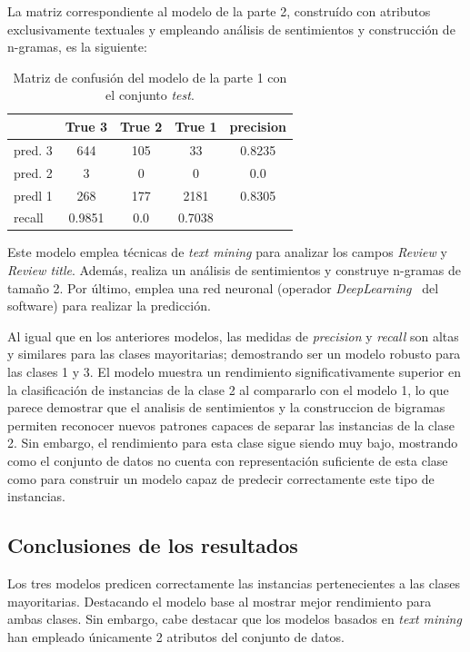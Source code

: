 \documentclass[es]{uc3mreport}
\begin{document}
\begin{report}
La matriz correspondiente al modelo de la parte 2, construído con atributos
exclusivamente textuales y empleando análisis de sentimientos y construcción de
n-gramas, es la siguiente:

\begin{table}[H]
\center
\begin{tabular}{@{}lccc|c@{}}
    \toprule
             & True 3 & True 2 & True 1 & precision\\
    \hline
    pred. 3  & 644 & 105       & 33     & 0.8235   \\
    pred. 2  & 3   & 0         & 0      & 0.0      \\
    predl 1  & 268 & 177       & 2181   & 0.8305   \\
    \hline
    recall   & 0.9851 & 0.0 & 0.7038 &          \\
    \bottomrule
\end{tabular}
\caption{Matriz de confusión del modelo de la parte 1 con el conjunto \textit{test}.}
\end{table}

Este modelo emplea técnicas de \textit{text mining} para analizar los campos
\textit{Review} y \textit{Review title}. Además, realiza un análisis de
sentimientos y construye n-gramas de tamaño 2. Por último, emplea una red neuronal (operador
\textit{DeepLearning}~\cite{deeplearning} del software) para realizar la
predicción.

Al igual que en los anteriores modelos, las medidas de \textit{precision} y
\textit{recall} son altas y similares para las clases mayoritarias; demostrando
ser un modelo robusto para las clases 1 y 3. El modelo muestra un
rendimiento significativamente superior en la clasificación de instancias de la clase
2 al compararlo con el modelo 1, lo que parece demostrar que el analisis de
sentimientos y la construccion de bigramas permiten reconocer nuevos patrones
capaces de separar las instancias de la clase 2. Sin embargo, el rendimiento
para esta clase sigue siendo muy bajo, mostrando como el conjunto de datos no
cuenta con representación suficiente de esta clase como para construir un modelo capaz de
predecir correctamente este tipo de instancias.

\subsection{Conclusiones de los resultados}
\label{subsec:comparar_conclusiones}

Los tres modelos predicen correctamente las instancias pertenecientes a las
clases mayoritarias. Destacando el modelo base al mostrar mejor rendimiento para
ambas clases. Sin embargo, cabe destacar que los modelos basados en
\textit{text mining} han empleado únicamente 2 atributos del conjunto de datos.


\end{report}
\end{document}
